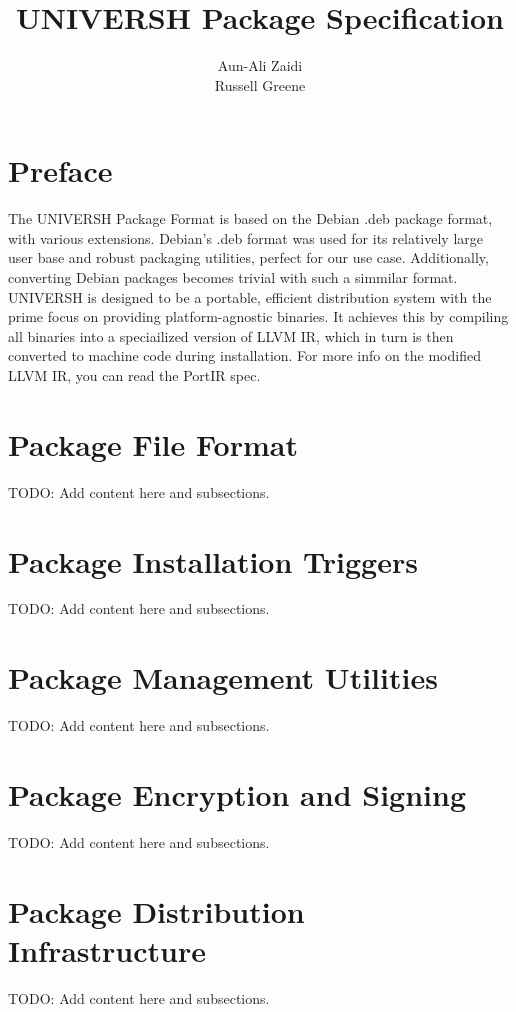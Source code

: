 \documentclass[llpt]{article}
\title{\textbf{UNIVERSH Package Specification}}
\author{Aun-Ali Zaidi\\
        Russell Greene}
\date{}
\begin{document}
\maketitle

\newpage

\tableofcontents

\newpage

\section {Preface}

The UNIVERSH Package Format is based on the Debian .deb package format, with various extensions. Debian's .deb format was used for its
relatively large user base and robust packaging utilities, perfect for our use case. Additionally, converting Debian packages becomes
trivial with such a simmilar format.
\newline
\newline
UNIVERSH is designed to be a portable, efficient distribution system with the prime focus on providing platform-agnostic
binaries. It achieves this by compiling all binaries into a speciailized version of LLVM IR, which in turn is then converted to machine code during
installation. For more info on the modified LLVM IR, you can read the PortIR spec.

\section {Package File Format}

TODO: Add content here and subsections.

\section {Package Installation Triggers}

TODO: Add content here and subsections.

\section {Package Management Utilities}

TODO: Add content here and subsections.

\section {Package Encryption and Signing}

TODO: Add content here and subsections.

\section {Package Distribution Infrastructure}

TODO: Add content here and subsections.
\end{document}
